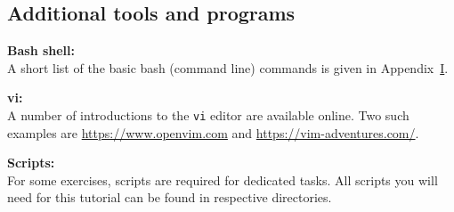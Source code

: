 \subsection{Additional tools and programs}

\noindent
\textbf{Bash shell:}\\
A short list of the basic bash (command line) commands is given in Appendix~\hyperref[app:bash]{I}.

\noindent 
\textbf{vi:} \\
A number of introductions to the \texttt{vi} editor are available online. Two such examples are \url{https://www.openvim.com} and \url{https://vim-adventures.com/}.


\noindent
\textbf{Scripts:}\\
For some exercises, scripts are required for dedicated tasks.
All scripts you will need for this tutorial can be found in respective directories. 

